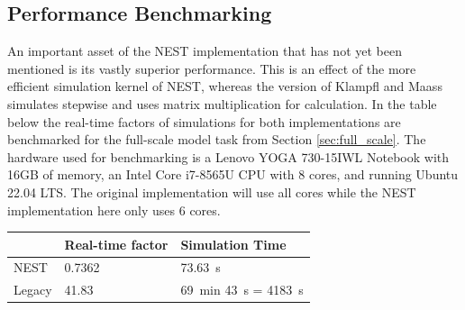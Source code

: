 \subsection{Performance Benchmarking}
An important asset of the NEST implementation that has not yet been mentioned is its vastly superior performance. This is an effect of the more efficient simulation kernel of NEST, whereas the version of Klampfl and Maass simulates stepwise and uses matrix multiplication for calculation. In the table below the real-time factors of simulations for both implementations are benchmarked for the full-scale model task from Section \ref{sec:full_scale}. The hardware used for benchmarking is a Lenovo YOGA 730-15IWL Notebook with 16GB of memory, an Intel Core i7-8565U CPU with 8 cores, and running Ubuntu 22.04 LTS. The original implementation will use all cores while the NEST implementation here only uses 6 cores.
\begin{table}[htbp]
\centering
\begin{tabular}{|l|l|l|}
\hline
       & Real-time factor & Simulation Time                                     \\ \hline
NEST   & 0.7362           & \SI{73.63}{\second}                                 \\
Legacy & 41.83            & \SI{69}{\minute} \SI{43}{\second} = \SI{4183}{\second} \\ \hline
\end{tabular}
\end{table}

